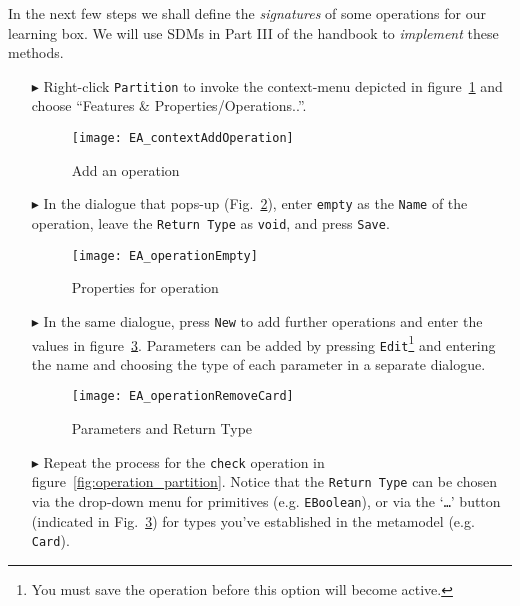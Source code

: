 In the next few steps we shall define the \emph{signatures} of some operations for our learning box. We will use SDMs in Part III of the handbook to \emph{implement} these methods.
\begin{enumerate}
\item[$\blacktriangleright$] Right-click \texttt{Partition} to invoke the context-menu depicted in figure~\ref{fig:add_operation} and choose ``Features \& Properties/Operations..''.

\begin{figure}[htbp]
	\centering
  \texttt{[image: EA\_contextAddOperation]}
	\caption{Add an operation}
	\label{fig:add_operation}
\end{figure}
\FloatBarrier

\item[$\blacktriangleright$] In the dialogue that pops-up (Fig.~\ref{fig:operation_properties}), enter \texttt{empty} as the \texttt{Name} of the operation, leave the \texttt{Return Type} as \texttt{void}, and press \texttt{Save}.

\begin{figure}[htbp]
	\centering
  	\texttt{[image: EA\_operationEmpty]}
	\caption{Properties for operation}
	\label{fig:operation_properties}
\end{figure}
\FloatBarrier

\item[$\blacktriangleright$] In the same dialogue, press \texttt{New} to add further operations and enter the values in figure~\ref{fig:operation_parameters}.  Parameters can be added by pressing \texttt{Edit}\footnote{You must save the operation before this option will become active.} and entering the name and choosing the type of each parameter in a separate dialogue.

\begin{figure}[htbp]
	\centering
  \texttt{[image: EA\_operationRemoveCard]}
	\caption{Parameters and Return Type}
	\label{fig:operation_parameters}
\end{figure}
\FloatBarrier

\vfill
\pagebreak

\item[$\blacktriangleright$] Repeat the process for the \texttt{check} operation in figure~\ref{fig:operation_partition}.
Notice that the \texttt{Return Type} can be chosen via the drop-down menu for primitives (e.g. \texttt{EBoolean}), or via the `\texttt{\ldots}' button (indicated in Fig.~\ref{fig:operation_parameters}) for types you've established in the metamodel (e.g. \texttt{Card}).
\end{enumerate}

